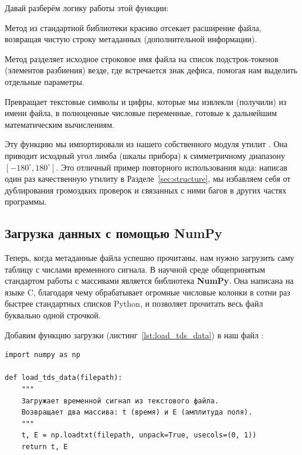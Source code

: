 Давай разберём логику работы этой функции:
\begin{syntaxdesc}
    \item[Отсечение расширения (строка 11) \mycode{Path(filename).stem}] Метод из стандартной библиотеки  красиво отсекает расширение файла, возвращая чистую строку метаданных (дополнительной информации).
    \item[Разбиение строки по дефису (строка 14) \mycode{split('-')}] Метод разделяет исходное строковое имя файла на список подстрок-токенов (элементов разбиения) везде, где встречается знак дефиса, помогая нам выделить отдельные параметры.
    \item[Преобразование типов (строки 20--22) \mycode{float()} и \mycode{int()}] Превращает текстовые символы и цифры, которые мы извлекли (получили) из имени файла, в полноценные числовые переменные, готовые к дальнейшим математическим вычислениям.
    \item[Нормализация полярного угла (строки 26--27) \mycode{normalize_angle(angle1)}] Эту функцию мы импортировали из нашего собственного модуля утилит . Она приводит исходный угол лимба (шкалы прибора) к симметричному диапазону $[-180^\circ, 180^\circ]$. Это отличный пример повторного использования кода: написав один раз качественную утилиту в Разделе~\ref{sec:structure}, мы избавляем себя от дублирования громоздких проверок и связанных с ними багов в других частях программы.
\end{syntaxdesc}

\subsection{Загрузка данных с помощью NumPy}

Теперь, когда метаданные файла успешно прочитаны, нам нужно загрузить саму таблицу с числами временного сигнала. В научной среде общепринятым стандартом работы с массивами является библиотека \textbf{NumPy}. Она написана на языке C, благодаря чему обрабатывает огромные числовые колонки в сотни раз быстрее стандартных списков Python, и позволяет прочитать весь файл буквально одной строчкой.

Добавим функцию загрузки  (листинг~\ref{lst:load_tds_data}) в наш файл :

\begin{listing}[H]
	\caption{Загрузка экспериментальных данных ()}\label{lst:load_tds_data}
	\begin{verbatim}
import numpy as np

def load_tds_data(filepath):
    """
    Загружает временной сигнал из текстового файла.
    Возвращает два массива: t (время) и E (амплитуда поля).
    """
    t, E = np.loadtxt(filepath, unpack=True, usecols=(0, 1))
    return t, E
	\end{verbatim}
\end{listing}

